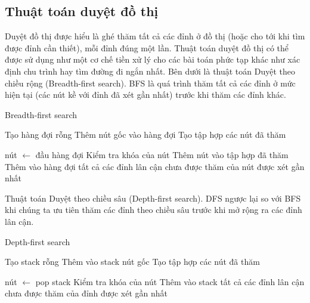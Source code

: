 \subsection{Thuật toán duyệt đồ thị}
Duyệt đồ thị được hiểu là ghé thăm tất cả các đỉnh ở đồ thị (hoặc cho tới khi tìm được đỉnh cần thiết), mỗi đỉnh đúng một lần. Thuật toán duyệt đồ thị có thể được sử dụng như một cơ chế tiền xử lý cho các bài toán phức tạp khác như xác định chu trình hay tìm đường đi ngắn nhất.
\linebreak
\linebreak
Bên dưới là thuật toán Duyệt theo chiều rộng (Breadth-first search). BFS là quá trình thăm tất cả các đỉnh ở mức hiện tại (các nút kề với đỉnh đã xét gần nhất) trước khi thăm các đỉnh khác.
\linebreak
\linebreak
\begin{algorithm}
\renewcommand{\thealgorithm}{}
\caption{Breadth-first search}\label{euclid}
\begin{algorithmic}[1]
	\State Tạo hàng đợi rỗng
	\State Thêm nút gốc vào hàng đợi
	\State Tạo tập hợp các nút đã thăm
			
		\State nút $\leftarrow$ đầu hàng đợi
		\State Kiểm tra khóa của nút
		\State Thêm nút vào tập hợp đã thăm
		\State Thêm vào hàng đợi tất cả các đỉnh lân cận chưa được thăm của nút được xét gần nhất
	\EndWhile
\EndProcedure
\end{algorithmic}
\end{algorithm}
\linebreak
Thuật toán Duyệt theo chiều sâu (Depth-first search). DFS ngược lại so với BFS khi chúng ta ưu tiên thăm các đỉnh theo chiều sâu trước khi mở rộng ra các đỉnh lân cận.
\linebreak
\begin{algorithm}
\renewcommand{\thealgorithm}{}
\caption{Depth-first search}\label{euclid}
\begin{algorithmic}[1]
	\State Tạo stack rỗng 
	\State Thêm vào stack nút gốc
	\State Tạo tập hợp các nút đã thăm 
			
		\State nút $\leftarrow$ pop stack
		\State Kiểm tra khóa của nút
		\State Thêm vào stack tất cả các đỉnh lân cận chưa được thăm của đỉnh được xét gần nhất
	\EndWhile
\EndProcedure
\end{algorithmic}
\end{algorithm}

